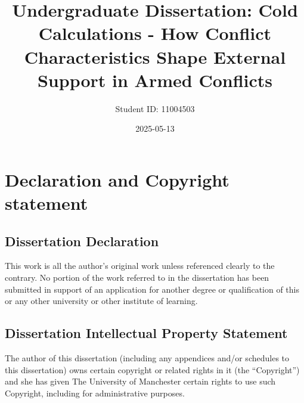 \documentclass[
]{article}
\title{Undergraduate Dissertation: Cold Calculations - How Conflict
Characteristics Shape External Support in Armed Conflicts}
\author{Student ID: 11004503}
\date{2025-05-13}
\begin{document}
\maketitle

{
\setcounter{tocdepth}{2}
\tableofcontents
}
\newpage

\section{Declaration and Copyright
statement}\label{declaration-and-copyright-statement}

\subsection{Dissertation Declaration}\label{dissertation-declaration}

This work is all the author's original work unless referenced clearly to
the contrary. No portion of the work referred to in the dissertation has
been submitted in support of an application for another degree or
qualification of this or any other university or other institute of
learning.

\subsection{Dissertation Intellectual Property
Statement}\label{dissertation-intellectual-property-statement}

The author of this dissertation (including any appendices and/or
schedules to this dissertation) owns certain copyright or related rights
in it (the ``Copyright'') and she has given The University of Manchester
certain rights to use such Copyright, including for administrative
purposes.
\end{document}
